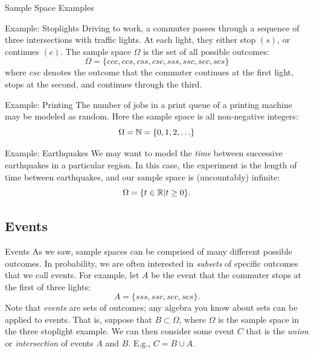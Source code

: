 \begin{frame}[allowframebreaks]{Sample Space Examples}
  \begin{exampleblock}{Example: Stoplights}
    Driving to work, a commuter passes through a sequence of three intersections with traffic lights. At each light, they either stop $(s)$, or continues $(c)$. The sample space $\Omega$ is the set of all possible outcomes: 
    $$
    \Omega = \{ccc, ccs, css, csc, sss, ssc, scc, scs\}
    $$
    where $csc$ denotes the outcome that the commuter continues at the first light, stops at the second, and continues through the third.
  \end{exampleblock}
  
    \begin{exampleblock}{Example: Printing}
      The number of jobs in a print queue of a printing machine may be modeled as random. Here the sample space is all non-negative integers: 
      $$\Omega = \mathbb{N} = \{0, 1, 2, \ldots\}$$
    \end{exampleblock}

  \begin{exampleblock}{Example: Earthquakes}
    We may want to model the \emph{time} between successive earthquakes in a particular region. In this case, the experiment is the length of time between earthquakes, and our sample space is (uncountably) infinite: 
    $$
    \Omega = \{t \in \mathbb{R}| t \geq 0\}. 
    $$
  \end{exampleblock}
\end{frame}

\subsection{Events}

\begin{frame}{Events}
  As we saw, sample spaces can be comprised of many different possible outcomes.
  In probability, we are often interested in \emph{subsets} of specific outcomes that we call \alert{events}. For example, let $A$ be the event that the commuter stops at the first of three lights: 
  $$
  A = \{sss, ssc, scc, scs\}.
  $$
  Note that \emph{events} are sets of outcomes; any algebra you know about sets can be applied to events. That is, suppose that $B \subset \Omega$, where $\Omega$ is the sample space in the three stoplight example. 
  We can then consider some event $C$ that is the \emph{union} or \emph{intersection} of events $A$ and $B$. E.g., $C = B \cup A$.
\end{frame}

